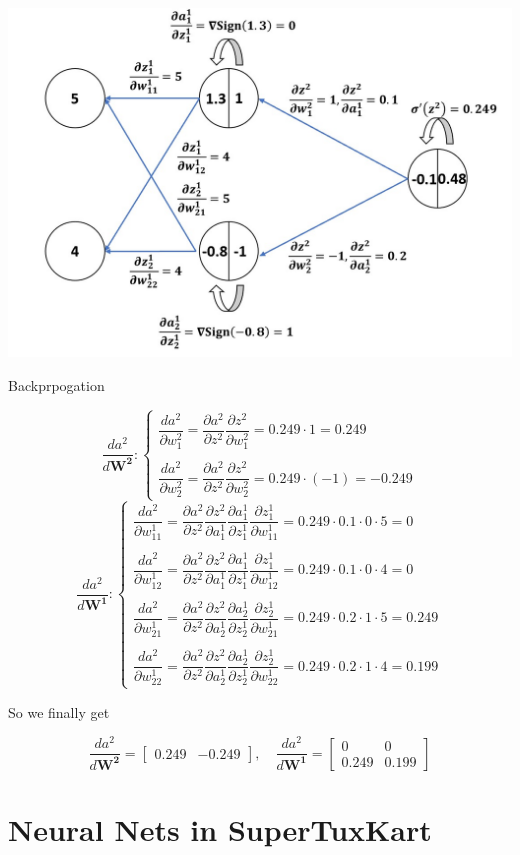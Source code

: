 \documentclass{article}
\begin{document}
		$$$$
        \begin{minipage}[t]{\linewidth}
        		\captionsetup{type=figure}
               	\centering
               	\includegraphics[width=0.6\linewidth]
                				{images/Q2b.jpg}
                \caption{Backprpogation}      
        \end{minipage} 
        
		\newpage        
		\[
  			\dfrac{da^2}{d\boldsymbol{W^2}}:
  			\begin{cases}
               \dfrac{da^2}{\partial{w^2_{1}}}=\dfrac{\partial a^2}{\partial{z^2}}\dfrac{\partial z^2}{\partial{w^2_1}}=0.249\cdot1=0.249\\\\
               \dfrac{da^2}{\partial{w^2_{2}}}=\dfrac{\partial a^2}{\partial{z^2}}\dfrac{\partial z^2}{\partial{w^2_2}}=0.249\cdot(-1)=-0.249
            \end{cases}
		\]
		$$$$
		\[
  			\dfrac{da^2}{d\boldsymbol{W^1}}:
  			\begin{cases}
               \dfrac{da^2}{\partial{w^1_{11}}}=\dfrac{\partial a^2}{\partial{z^2}}\dfrac{\partial z^2}{\partial{a^1_1}}\dfrac{\partial a^1_1}{\partial{z^1_1}}\dfrac{\partial z^1_1}{\partial{w^1_{11}}}=0.249\cdot0.1\cdot0\cdot5=0\\\\
               \dfrac{da^2}{\partial{w^1_{12}}}=\dfrac{\partial a^2}{\partial{z^2}}\dfrac{\partial z^2}{\partial{a^1_1}}\dfrac{\partial a^1_1}{\partial{z^1_1}}\dfrac{\partial z^1_1}{\partial{w^1_{12}}}=0.249\cdot0.1\cdot0\cdot4=0\\\\
               \dfrac{da^2}{\partial{w^1_{21}}}=\dfrac{\partial a^2}{\partial{z^2}}\dfrac{\partial z^2}{\partial{a^1_2}}\dfrac{\partial a^1_2}{\partial{z^1_2}}\dfrac{\partial z^1_2}{\partial{w^1_{21}}}=0.249\cdot0.2\cdot1\cdot5=0.249\\\\
               \dfrac{da^2}{\partial{w^1_{22}}}=\dfrac{\partial a^2}{\partial{z^2}}\dfrac{\partial z^2}{\partial{a^1_2}}\dfrac{\partial a^1_2}{\partial{z^1_2}}\dfrac{\partial z^1_2}{\partial{w^1_{22}}}=0.249\cdot0.2\cdot1\cdot4=0.199
            \end{cases}
		\]
		
    	So we finally get
    	
    	$$\dfrac{da^2}{d\boldsymbol{W^2}}=\begin{bmatrix}0.249 & -0.249\end{bmatrix},\quad \dfrac{da^2}{d\boldsymbol{W^1}}=\begin{bmatrix}0 & 0\\0.249 & 0.199\end{bmatrix}$$
    	$$$$
			
        
    \section{Neural Nets in SuperTuxKart}
       
\end{document}
